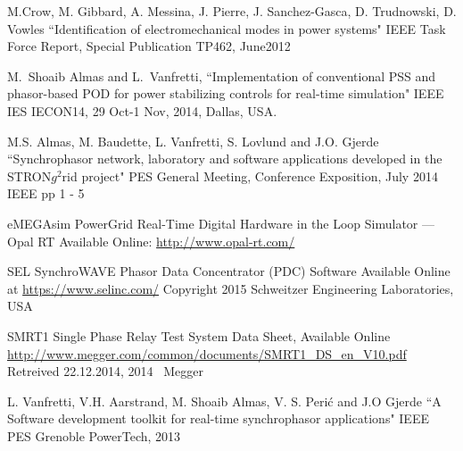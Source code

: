 \documentclass[a4paper, 10 pt, conference]{IEEEtran}
\begin{document}
\begin{thebibliography}{1}
 M.Crow, M. Gibbard, A. Messina, J. Pierre, J. Sanchez-Gasca, D. Trudnowski, D. Vowles ``Identification of electromechanical modes in power systems" IEEE Task Force Report, Special Publication TP462, June2012

 M.~Shoaib Almas and L.~Vanfretti, ``Implementation of conventional PSS and phasor-based POD for power stabilizing controls for real-time simulation" IEEE IES IECON14, 29 Oct-1 Nov, 2014, Dallas, USA.

 M.S. Almas, M. Baudette, L. Vanfretti, S. Lovlund and J.O. Gjerde ``Synchrophasor network, laboratory and software applications developed in the STRON$g^{2}$rid project" PES General Meeting, Conference Exposition, July 2014 IEEE pp 1 - 5

 eMEGAsim PowerGrid Real-Time Digital Hardware in the Loop Simulator — Opal RT Available Online: \url{http://www.opal-rt.com/}

 SEL SynchroWAVE Phasor Data Concentrator (PDC) Software Available Online at \url{https://www.selinc.com/} Copyright 2015 Schweitzer Engineering Laboratories, USA

 SMRT1 Single Phase Relay Test System Data Sheet, Available Online \url{http://www.megger.com/common/documents/SMRT1_DS_en_V10.pdf} Retreived 22.12.2014, 2014 \textcopyright~Megger

 L. Vanfretti, V.H. Aarstrand, M. Shoaib Almas, V. S. Peri\'c and J.O Gjerde ``A Software development toolkit for real-time synchrophasor applications"  IEEE PES Grenoble PowerTech, 2013






\end{thebibliography}
\end{document}
